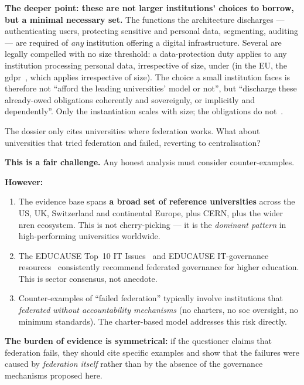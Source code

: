 \begin{answerbox}[Answer to Q5.1]
\medskip\noindent\textbf{The deeper point: these are not larger institutions' choices to borrow, but a minimal necessary set.} The functions the architecture discharges --- authenticating users, protecting sensitive and personal data, segmenting, auditing --- are required of \emph{any} institution offering a digital infrastructure. Several are legally compelled with no size threshold: a data-protection duty applies to any institution processing personal data, irrespective of size, under  (in the EU, the \gls{gdpr}~\cite{gdpr}, which applies irrespective of size). The choice a small institution faces is therefore not ``afford the leading universities' model or not'', but ``discharge these already-owed obligations coherently and sovereignly, or implicitly and dependently''. Only the instantiation scales with size; the obligations do not~\cite{ng-tech-ref-2026}.
\end{answerbox}

\bigskip

\begin{questionbox}
The dossier only cites universities where federation works. What about universities that tried federation and failed, reverting to centralisation?
\end{questionbox}

\begin{answerbox}[Answer to Q5.2]
\textbf{This is a fair challenge.} Any honest analysis must consider counter-examples.

\medskip\noindent\textbf{However:}
\begin{enumerate}[nosep]
    \item The evidence base spans \textbf{a broad set of reference universities} across the US, UK, Switzerland and continental Europe, plus CERN, plus the wider \gls{nren} ecosystem. This is not cherry-picking --- it is the \emph{dominant pattern} in high-performing universities worldwide.
    \item The EDUCAUSE Top~10 IT Issues~\cite{educause2024} and EDUCAUSE IT-governance resources~\cite{educause-governance} consistently recommend federated governance for higher education. This is sector consensus, not anecdote.
    \item Counter-examples of ``failed federation'' typically involve institutions that \emph{federated without accountability mechanisms} (no charters, no \gls{soc} oversight, no minimum standards). The charter-based model addresses this risk directly.
\end{enumerate}

\noindent\textbf{The burden of evidence is symmetrical:} if the questioner claims that federation fails, they should cite specific examples and show that the failures were caused by \emph{federation itself} rather than by the absence of the governance mechanisms proposed here.
\end{answerbox}

